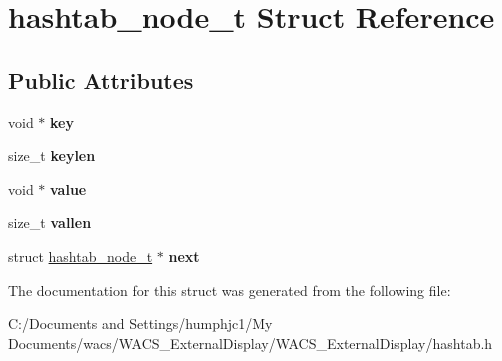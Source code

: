 \hypertarget{structhashtab__node__t}{
\section{hashtab\_\-node\_\-t Struct Reference}
\label{structhashtab__node__t}
}
\subsection*{Public Attributes}
\begin{DoxyCompactItemize}
\item 
\hypertarget{structhashtab__node__t_a820342a9d2d14bf760cecfa0ee2c4dab}{
void $\ast$ {\bfseries key}}
\label{structhashtab__node__t_a820342a9d2d14bf760cecfa0ee2c4dab}

\item 
\hypertarget{structhashtab__node__t_ad988bbc8d821c653b38ab2158de80655}{
size\_\-t {\bfseries keylen}}
\label{structhashtab__node__t_ad988bbc8d821c653b38ab2158de80655}

\item 
\hypertarget{structhashtab__node__t_abd9c990c0066c71bcbd070278b8ef70d}{
void $\ast$ {\bfseries value}}
\label{structhashtab__node__t_abd9c990c0066c71bcbd070278b8ef70d}

\item 
\hypertarget{structhashtab__node__t_ad945551f194436e42975300be4c1ed2c}{
size\_\-t {\bfseries vallen}}
\label{structhashtab__node__t_ad945551f194436e42975300be4c1ed2c}

\item 
\hypertarget{structhashtab__node__t_a61a6d026fae7e2d6a67a92d3d9e7b17e}{
struct \hyperlink{structhashtab__node__t}{hashtab\_\-node\_\-t} $\ast$ {\bfseries next}}
\label{structhashtab__node__t_a61a6d026fae7e2d6a67a92d3d9e7b17e}

\end{DoxyCompactItemize}


The documentation for this struct was generated from the following file:\begin{DoxyCompactItemize}
\item 
C:/Documents and Settings/humphjc1/My Documents/wacs/WACS\_\-ExternalDisplay/WACS\_\-ExternalDisplay/hashtab.h\end{DoxyCompactItemize}
